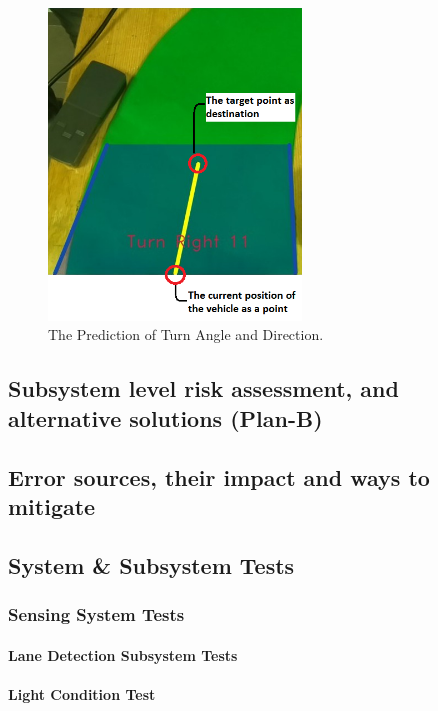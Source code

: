 \documentclass[a4paper,12pt]{article}
\begin{document}
\begin{figure}[H]
	\center
	\setlength{\unitlength}{\textwidth} 
	\includegraphics[width=0.6\textwidth]{images/turn-prediction-explained}
	\caption{\label{fig:turn-prediction-explained}The Prediction of Turn Angle and Direction.}
\end{figure}
	\subsection{Subsystem level risk assessment, and alternative solutions (Plan-B)}
	
	
	\subsection{ Error sources, their impact and ways to mitigate}
	
	
	\subsection{System \& Subsystem Tests }
	

	\subsubsection{Sensing System Tests}
	
		

	\paragraph{Lane Detection Subsystem Tests}	
	
		\paragraph{Light Condition Test}
		
\end{document}
